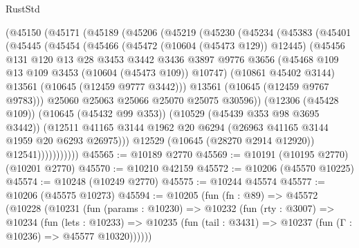 \begin{lexlean}{RustStd}
\begin{coremodule}
          (@45150
            (@45171
              (@45189
                (@45206
                  (@45219
                    (@45230
                      (@45234
                        (@45383
                          (@45401
                            (@45445
                              (@45454
                                (@45466
                                  (@45472 (@10604 (@45473 @129)) @12445)
                                  (@45456
                                    @131
                                    @120
                                    @13
                                    @28
                                    @3453
                                    @3442
                                    @3436
                                    @3897
                                    @9776
                                    @3656
                                    (@45468 @109 @13 @109 @3453 (@10604 (@45473 @109)) @10747)
                                    (@10861 @45402 @3144)
                                    @13561
                                    (@10645 (@12459 @9777 @3442)))
                                  @13561
                                  (@10645 (@12459 @9767 @9783)))
                                @25060
                                @25063
                                @25066
                                @25070
                                @25075
                                @30596))
                            (@12306 (@45428 @109))
                            (@10645 (@45432 @99 @353))
                            (@10529 (@45439 @353 @98 @3695 @3442))
                            (@12511
                              @41165
                              @3144
                              @1962
                              @20
                              @6294
                              (@26963 @41165 @3144 @1959 @20 @6293 @26975)))
                          @12529
                          (@10645 (@28270 @2914 @12920))
                          @12541)))))))))))
@45565 := @10189 @2770
@45569 := @10191 (@10195 @2770) (@10201 @2770)
@45570 := @10210 @42159
@45572 := @10206 (@45570 @10225)
@45574 := @10248 (@10249 @2770)
@45575 := @10244 @45574
@45577 := @10206 (@45575 @10273)
@45594 := @10205
    (fun (fn : @89) =>
    @45572
      (@10228
        (@10231
          (fun (params : @10230) =>
          @10232
            (fun (rty : @3007) =>
            @10234
              (fun (lets : @10233) =>
              @10235 (fun (tail : @3431) => @10237 (fun (Γ : @10236) => @45577 @10320))))))

\end{coremodule}
\end{lexlean}
